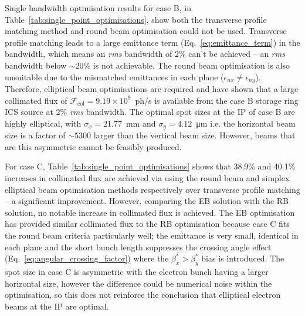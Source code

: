 \documentclass[../main.tex]{subfiles}
\begin{document}
Single bandwidth optimisation results for case B, in Table~\ref{tab:single_point_optimisations}, show both the transverse profile matching method and round beam optimisation could not be used. Transverse profile matching leads to a large emittance term (Eq.~\ref{eq:emittance_term}) in the bandwidth, which means an \textit{rms} bandwidth of 2\% can't be achieved -- an \textit{rms} bandwidth below $\sim$20\% is not achievable. The round beam optimisation is also unsuitable due to the mismatched emittances in each plane ($\epsilon_{nx}\neq\epsilon_{ny}$). Therefore, elliptical beam optimisations are required and have shown that a large collimated flux of $\mathcal{F}_{\mathrm{col}} = 9.19\times 10^{9}$~ph/\si{\second} is available from the case B storage ring ICS source at 2\% \textit{rms} bandwidth. The optimal spot sizes at the IP of case B are highly elliptical, with $\sigma_{x} = 21.77$~\si{\milli\meter} and $\sigma_{y} = 4.12$~\si{\micro\meter} i.e. the horizontal beam size is a factor of $\sim 5300$ larger than the vertical beam size. However, beams that are this asymmetric cannot be feasibly produced.

For case C, Table~\ref{tab:single_point_optimisations} shows that 38.9\% and 40.1\% increases in collimated flux are achieved via using the round beam and simplex elliptical beam optimisation methods respectively over transverse profile matching -- a significant improvement. However, comparing the EB solution with the RB solution, no notable increase in collimated flux is achieved. The EB optimisation has provided similar collimated flux to the RB optimisation because case C fits the round beam criteria particularly well; the emittance is very small, identical in each plane and the short bunch length suppresses the crossing angle effect (Eq.~\ref{eq:angular_crossing_factor}) where the $\beta_{x}^{*} > \beta_{y}^{*}$ bias is introduced. The spot size in case C is asymmetric with the electron bunch having a larger horizontal size, however the difference could be numerical noise within the optimisation, so this does not reinforce the conclusion that elliptical electron beams at the IP are optimal.
\end{document}
